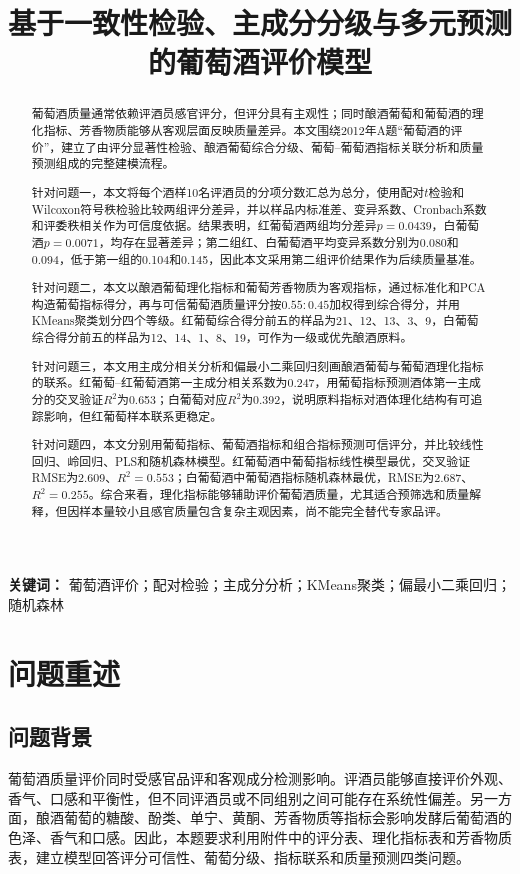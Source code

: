 \documentclass[UTF8,a4paper,12pt]{ctexart}
\title{\heiti 基于一致性检验、主成分分级与多元预测的葡萄酒评价模型}
\author{}\date{}
\begin{document}
\maketitle
\begin{abstract}
葡萄酒质量通常依赖评酒员感官评分，但评分具有主观性；同时酿酒葡萄和葡萄酒的理化指标、芳香物质能够从客观层面反映质量差异。本文围绕2012年A题“葡萄酒的评价”，建立了由评分显著性检验、酿酒葡萄综合分级、葡萄--葡萄酒指标关联分析和质量预测组成的完整建模流程。

针对问题一，本文将每个酒样10名评酒员的分项分数汇总为总分，使用配对$t$检验和Wilcoxon符号秩检验比较两组评分差异，并以样品内标准差、变异系数、Cronbach系数和评委秩相关作为可信度依据。结果表明，红葡萄酒两组均分差异$p=0.0439$，白葡萄酒$p=0.0071$，均存在显著差异；第二组红、白葡萄酒平均变异系数分别为0.080和0.094，低于第一组的0.104和0.145，因此本文采用第二组评价结果作为后续质量基准。

针对问题二，本文以酿酒葡萄理化指标和葡萄芳香物质为客观指标，通过标准化和PCA构造葡萄指标得分，再与可信葡萄酒质量评分按$0.55:0.45$加权得到综合得分，并用KMeans聚类划分四个等级。红葡萄综合得分前五的样品为21、12、13、3、9，白葡萄综合得分前五的样品为12、14、1、8、19，可作为一级或优先酿酒原料。

针对问题三，本文用主成分相关分析和偏最小二乘回归刻画酿酒葡萄与葡萄酒理化指标的联系。红葡萄--红葡萄酒第一主成分相关系数为0.247，用葡萄指标预测酒体第一主成分的交叉验证$R^2$为0.653；白葡萄对应$R^2$为0.392，说明原料指标对酒体理化结构有可追踪影响，但红葡萄样本联系更稳定。

针对问题四，本文分别用葡萄指标、葡萄酒指标和组合指标预测可信评分，并比较线性回归、岭回归、PLS和随机森林模型。红葡萄酒中葡萄指标线性模型最优，交叉验证RMSE为2.609、$R^2=0.553$；白葡萄酒中葡萄酒指标随机森林最优，RMSE为2.687、$R^2=0.255$。综合来看，理化指标能够辅助评价葡萄酒质量，尤其适合预筛选和质量解释，但因样本量较小且感官质量包含复杂主观因素，尚不能完全替代专家品评。
\end{abstract}
\noindent\textbf{关键词：} 葡萄酒评价；配对检验；主成分分析；KMeans聚类；偏最小二乘回归；随机森林
\newpage\tableofcontents\newpage
\section{问题重述}
\subsection{问题背景}
葡萄酒质量评价同时受感官品评和客观成分检测影响。评酒员能够直接评价外观、香气、口感和平衡性，但不同评酒员或不同组别之间可能存在系统性偏差。另一方面，酿酒葡萄的糖酸、酚类、单宁、黄酮、芳香物质等指标会影响发酵后葡萄酒的色泽、香气和口感。因此，本题要求利用附件中的评分表、理化指标表和芳香物质表，建立模型回答评分可信性、葡萄分级、指标联系和质量预测四类问题。
\end{document}
